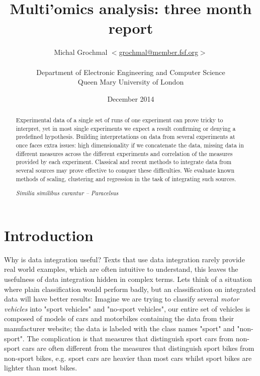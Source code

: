 \documentclass[11pt,a4paper,twoside,openright]{report}
\title{Multi'omics analysis: three month report}
\author{Michal Grochmal
  $<$\href{mailto:grochmal@member.fsf.org}{grochmal@member.fsf.org}$>$\\
  \\
  Department of Electronic Engineering and Computer Science\\
  Queen Mary University of London
}
\date{December 2014}
\begin{document}
\maketitle

\newpage
\null
\thispagestyle{empty}
\newpage

\pagestyle{fancy}
\lhead{}
\rhead{}

\begin{abstract}
Experimental data of a single set of runs of one experiment can prove tricky to
interpret, yet in most single experiments we expect a result confirming or
denying a predefined hypothesis.  Building interpretations on data from several
experiments at once faces extra issues: high dimensionality if we concatenate
the data, missing data in different measures across the different experiments
and correlation of the measures provided by each experiment.  Classical and
recent methods to integrate data from several sources may prove effective to
conquer these difficulties.  We evaluate known methods of scaling, clustering
and regression in the task of integrating such sources.
\begin{flushright}
\emph{Similia similibus curantur -- Paracelsus}
\end{flushright}
\end{abstract}

\newpage
\null
\thispagestyle{empty}
\newpage

\newpage
\setcounter{page}{1}

\clearpage{\pagestyle{empty}\cleardoublepage}
\chapter{Introduction}

Why is data integration useful?  Texts that use data integration rarely provide
real world examples, which are often intuitive to understand, this leaves the
usefulness of data integration hidden in complex terms.  Lets think of a
situation where plain classification would perform badly, but an classification
on integrated data will have better results:  Imagine we are trying to classify
several \emph{motor vehicles} into "sport vehicles" and "no-sport vehicles",
our entire set of vehicles is composed of models of cars and motorbikes
containing the data from their manufacturer website; the data is labeled with
the class names "sport" and "non-sport".  The complication is that measures
that distinguish sport cars from non-sport cars are often different from the
measures that distinguish sport bikes from non-sport bikes, e.g. sport cars are
heavier than most cars whilst sport bikes are lighter than most bikes.
\end{document}
